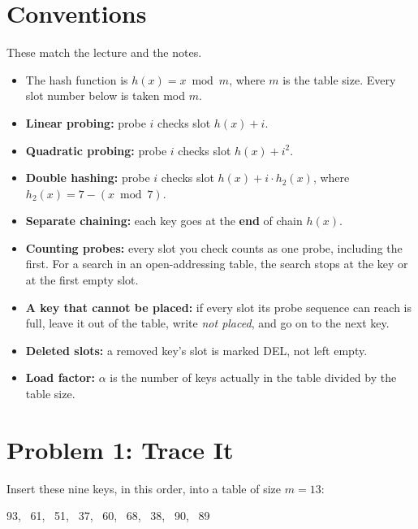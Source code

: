 \documentclass[11pt]{article}
\begin{document}
\section{Conventions}

These match the lecture and the notes.

\begin{itemize}[leftmargin=1.4em]
  \item The hash function is $h(x) = x \bmod m$, where $m$ is the table size. Every slot
    number below is taken mod $m$.
  \item \textbf{Linear probing:} probe $i$ checks slot $h(x) + i$.
  \item \textbf{Quadratic probing:} probe $i$ checks slot $h(x) + i^2$.
  \item \textbf{Double hashing:} probe $i$ checks slot $h(x) + i \cdot h_2(x)$, where
    $h_2(x) = 7 - (x \bmod 7)$.
  \item \textbf{Separate chaining:} each key goes at the \textbf{end} of chain $h(x)$.
  \item \textbf{Counting probes:} every slot you check counts as one probe, including the
    first. For a search in an open-addressing table, the search stops at the key or at the
    first empty slot.
  \item \textbf{A key that cannot be placed:} if every slot its probe sequence can reach is
    full, leave it out of the table, write \emph{not placed}, and go on to the next key.
  \item \textbf{Deleted slots:} a removed key's slot is marked DEL, not left empty.
  \item \textbf{Load factor:} $\alpha$ is the number of keys actually in the table divided by
    the table size.
\end{itemize}

\section{Problem 1: Trace It}

Insert these nine keys, in this order, into a table of size $m = 13$:

\begin{center}
93, \ 61, \ 51, \ 37, \ 60, \ 68, \ 38, \ 90, \ 89
\end{center}
\end{document}
